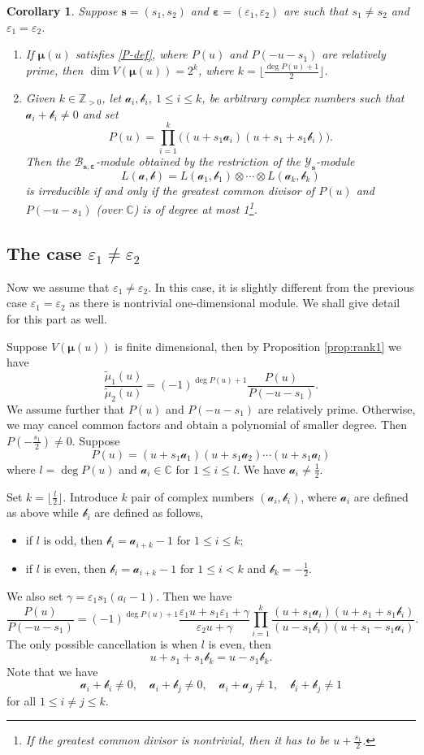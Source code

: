 \documentclass[11pt,reqno]{amsart}
\numberwithin{equation}{section}
\newtheorem{cor}[thm]{Corollary}
\theoremstyle{definition}
\theoremstyle{remark}
\newcommand{\beq}{\begin{equation}}
\newcommand{\eeq}{\end{equation}}
\newcommand{\C}{\mathbb{C}}
\newcommand{\mc}{\mathcal}
\newcommand{\bC}{\mathbb{C}}
\newcommand{\bZ}{\mathbb{Z}}
\newcommand{\tl}{\tilde}
\newcommand{\lle}{\leqslant}
\newcommand{\YMN}{{\mathscr{Y}_{\bm s}}}
\newcommand{\BMN}{{\mathscr{B}_{\bm s,\bm \ve}}}
\newcommand{\ve}{\varepsilon}
\newcommand{\s}{{\bm s}}
\begin{document}
\begin{cor}
Suppose $\s=(s_1,s_2)$ and $\bm \ve=(\ve_1,\ve_2)$ are such that $s_1\ne s_2$ and $\ve_1=\ve_2$.
\begin{enumerate}
    \item If $\bm\mu(u)$ satisfies \eqref{P-def}, where $P(u)$ and $P(-u-s_1)$ are relatively prime, then $\dim V(\bm\mu(u))=2^k$, where $k=\big\lfloor\frac{\deg P(u)+1}{2}\big\rfloor$.
    \item Given $k\in\bZ_{>0}$, let $\mc a_i,\mc b_i$, $1\lle i\lle k$, be arbitrary complex numbers such that $\mc a_i+\mc b_i\ne 0$ and set $$P(u)=\prod_{i=1}^k\big((u+s_1\mc a_i)(u+s_1+s_1\mc b_i)\big).$$ Then the $\BMN$-module obtained by the restriction of the $\YMN$-module
    \[
    L(\bm{\mc a,\mc b})=L(\mc a_1,\mc b_1)\otimes \cdots\otimes L(\mc a_k,\mc b_k)
    \]
    is irreducible if and only if the greatest common divisor of $P(u)$ and $P(-u-s_1)$ (over $\bC$) is of degree at most 1\footnote{If the greatest common divisor is nontrivial, then it has to be $u+\frac{s_1}{2}$.}.
\end{enumerate}
\end{cor}

\subsection{The case $\ve_1\ne \ve_2$}
Now we assume that $\ve_1\ne \ve_2$. In this case, it is slightly different from the previous case $\ve_1=\ve_2$ as there is nontrivial one-dimensional module. We shall give detail for this part as well.

Suppose $V(\bm\mu(u))$ is finite dimensional, then by Proposition \ref{prop:rank1} we have
\beq\label{P-def2}
\frac{\tl \mu_1(u)}{\tl \mu_2(u)}=(-1)^{\deg P(u)+1}\frac{P(u)}{P(-u-s_1)}.
\eeq
We assume further that $P(u)$ and $P(-u-s_1)$ are relatively prime. Otherwise, we may cancel common factors and obtain a polynomial of smaller degree. Then $P(-\frac{s_1}{2})\ne 0$. Suppose
\[
P(u)=(u+s_1\mc a_1)(u+s_1\mc a_2)\cdots (u+s_1\mc a_{l})
\]
where $l=\deg P(u)$ and $\mc a_i\in\C$ for $1\lle i\lle l$. We have $\mc a_i\ne \frac{1}{2}$.

Set $k=\lfloor\frac{l}{2} \rfloor$. Introduce $k$ pair of complex numbers $(\mc a_i,\mc b_i)$, where $\mc a_i$ are defined as above while $\mc b_i$ are defined as follows,
\begin{itemize}
    \item if $l$ is odd, then $\mc b_i=\mc a_{i+k}-1$ for $1\lle i\lle k$;
    \item if $l$ is even, then $\mc b_i=\mc a_{i+k}-1$ for $1\lle i< k$ and $\mc b_k=-\frac{1}{2}$.
\end{itemize}
We also set $\gamma=\ve_1s_1(a_{l}-1)$. Then we have
\beq\label{P-factor2}
\frac{P(u)}{P(-u-s_1)}=(-1)^{\deg P(u)+1}\frac{\ve_1u+s_1\ve_1+\gamma}{\ve_2u+\gamma}\prod_{i=1}^k\frac{(u+s_1\mc a_i)(u+s_1+s_1\mc b_i)}{(u-s_1\mc b_i)(u+s_1-s_1\mc a_i)}.
\eeq
The only possible cancellation is when $l$ is even, then
\[
u+s_1+s_1\mc b_k=u-s_1\mc b_k.
\]
Note that we have
\beq\label{notequalto2}
\mc a_i+\mc b_i\ne 0,\quad \mc a_i+\mc b_j\ne 0, \quad \mc a_i+\mc a_j\ne 1,\quad \mc b_i+\mc b_j\ne 1
\eeq
for all $1\lle i\ne j\lle k$.
\end{document}
